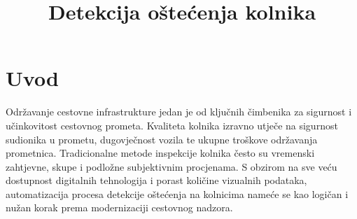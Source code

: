 \documentclass[conference]{IEEEtran}
\begin{document}
\title{Detekcija oštećenja kolnika}

\author{
\and
{}
\and
{}
\and
{}
\and
{}

}


\maketitle







\section{Uvod}
\label{pog:uvod}

Održavanje cestovne infrastrukture jedan je od ključnih čimbenika za sigurnost i učinkovitost cestovnog prometa. Kvaliteta kolnika izravno utječe na sigurnost sudionika u prometu, dugovječnost vozila te ukupne troškove održavanja prometnica. Tradicionalne metode inspekcije kolnika često su vremenski zahtjevne, skupe i podložne subjektivnim procjenama. S obzirom na sve veću dostupnost digitalnih tehnologija i porast količine vizualnih podataka, automatizacija procesa detekcije oštećenja na kolnicima nameće se kao logičan i nužan korak prema modernizaciji cestovnog nadzora.
\end{document}
